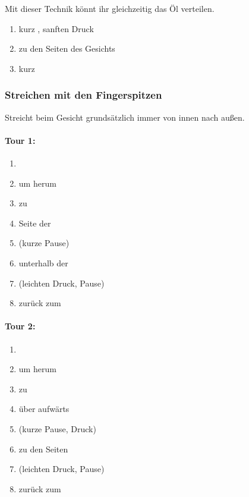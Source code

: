 Mit dieser Technik könnt ihr gleichzeitig das Öl verteilen.

\begin{enumerate}
  \item kurz , sanften Druck
  \item {} zu den Seiten des Gesichts
  \item kurz 
\end{enumerate}

\newpage
\subsubsection{Streichen mit den Fingerspitzen}

Streicht beim Gesicht grundsätzlich immer von innen nach außen.

\begin{multicols}{2}

\paragraph{Tour 1:}
\begin{enumerate}
  \item {}
  \item um  herum
  \item zu 
  \item Seite der 
  \item {} (kurze Pause)
  \item unterhalb der 
  \item {} (leichten Druck, Pause)
  \item zurück zum 
\end{enumerate}

\columnbreak

\paragraph{Tour 2:}
\begin{enumerate}
  \item {}
  \item um  herum
  \item zu 
  \item über  aufwärts
  \item {} (kurze Pause, Druck)
  \item {} zu den Seiten
  \item {} (leichten Druck, Pause)
  \item zurück zum 
\end{enumerate}

\end{multicols}


